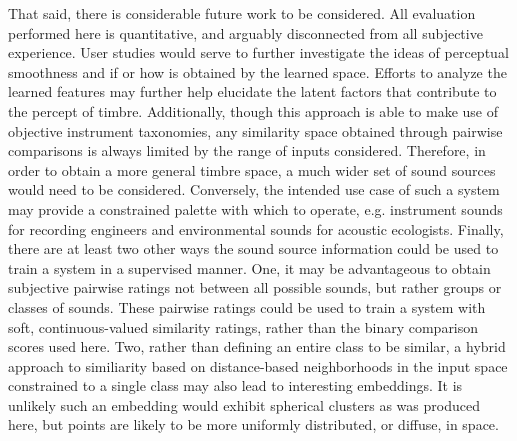 That said, there is considerable future work to be considered.
All evaluation performed here is quantitative, and arguably disconnected from all subjective experience.
User studies would serve to further investigate the ideas of perceptual smoothness and if or how is obtained by the learned space.
Efforts to analyze the learned features may further help elucidate the latent factors that contribute to the percept of timbre.
Additionally, though this approach is able to make use of objective instrument taxonomies, any similarity space obtained through pairwise comparisons is always limited by the range of inputs considered.
Therefore, in order to obtain a more general timbre space, a much wider set of sound sources would need to be considered.
Conversely, the intended use case of such a system may provide a constrained palette with which to operate, e.g. instrument sounds for recording engineers and environmental sounds for acoustic ecologists.
Finally, there are at least two other ways the sound source information could be used to train a system in a supervised manner.
One, it may be advantageous to obtain subjective pairwise ratings not between all possible sounds, but rather groups or classes of sounds.
These pairwise ratings could be used to train a system with soft, continuous-valued similarity ratings, rather than the binary comparison scores used here.
Two, rather than defining an entire class to be similar, a hybrid approach to similiarity based on distance-based neighborhoods in the input space constrained to a single class may also lead to interesting embeddings.
It is unlikely such an embedding would exhibit spherical clusters as was produced here, but points are likely to be more uniformly distributed, or diffuse, in space.

